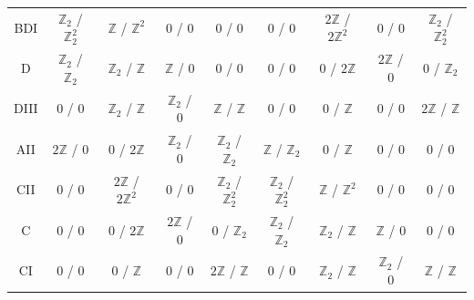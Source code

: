 \documentclass[prl,twocolumn,preprintnumbers,superscriptaddress,amsmath,amssymb]{revtex4-1}
\begin{document}
\begin{table}[tbp]
\begin{center}
\begin{tabular}{ccccccccc}
BDI & $\mathbb{Z}_2$ / \colorbox{blue!10!white}{$\mathbb{Z}_2^2$} & $\mathbb{Z}$ / \colorbox{blue!10!white}{$\mathbb{Z}^2$} & 0 / 0 & 0 / 0 & 0 / 0 & $2\mathbb{Z}$ /  \colorbox{blue!10!white}{$2\mathbb{Z}^2$} & 0 / 0 & $\mathbb{Z}_2$ /  \colorbox{blue!10!white}{$\mathbb{Z}_2^2$} \\
D & $\mathbb{Z}_2$ / $\mathbb{Z}_2$  & $\mathbb{Z}_2$ / \colorbox{blue!10!white}{$\mathbb{Z}$}  & \colorbox{red!25!white}{$\mathbb{Z}$} / 0 & 0 / 0 & 0 / 0 & 0 / \colorbox{blue!25!white}{$2\mathbb{Z}$} & \colorbox{red!25!white}{$2\mathbb{Z}$} / 0 & 0 / \colorbox{blue!25!white}{$\mathbb{Z}_2$} \\
DIII & 0 / 0 & $\mathbb{Z}_2$ / \colorbox{blue!10!white}{$\mathbb{Z}$} & \colorbox{red!25!white}{$\mathbb{Z}_2$} / 0 & \colorbox{red!10!white}{$\mathbb{Z}$} / $\mathbb{Z}$ & 0 / 0 & 0 / \colorbox{blue!25!white}{$\mathbb{Z}$} & 0 / 0 & $2\mathbb{Z}$ / $\mathbb{Z}$ \\
AII & \colorbox{red!25!white}{$2\mathbb{Z}$} / 0 & 0 / \colorbox{blue!25!white}{$2\mathbb{Z}$} & \colorbox{red!25!white}{$\mathbb{Z}_2$} / 0 & \colorbox{red!25!white}{$\mathbb{Z}_2$} / \colorbox{blue!25!white}{$\mathbb{Z}_2$} & \colorbox{red!25!white}{$\mathbb{Z}$} / \colorbox{blue!25!white}{$\mathbb{Z}_2$} & 0 / \colorbox{blue!25!white}{$\mathbb{Z}$} & 0 / 0 & 0 / 0 \\
CII & 0 / 0 & $2\mathbb{Z}$ / \colorbox{blue!10!white}{$2\mathbb{Z}^2$} & 0 / 0 & $\mathbb{Z}_2$ / \colorbox{blue!10!white}{$\mathbb{Z}_2^2$} & $\mathbb{Z}_2$ / \colorbox{blue!10!white}{$\mathbb{Z}_2^2$} & $\mathbb{Z}$ / \colorbox{blue!10!white}{$\mathbb{Z}^2$} & 0 / 0 & 0 / 0 \\
C & 0 / 0 & 0 / \colorbox{blue!25!white}{$2\mathbb{Z}$} & \colorbox{red!25!white}{$2\mathbb{Z}$} / 0 & $0$ / \colorbox{blue!25!white}{$\mathbb{Z}_2$} & $\mathbb{Z}_2$ / $\mathbb{Z}_2$ & $\mathbb{Z}_2$ / \colorbox{blue!10!white}{$\mathbb{Z}$} &  \colorbox{red!25!white}{$\mathbb{Z}$} / 0 & 0 / 0 \\
CI & 0 / 0 & 0 / \colorbox{blue!25!white}{$\mathbb{Z}$} & 0 / 0 & $2\mathbb{Z}$ / $\mathbb{Z}$ & 0 / 0 & $\mathbb{Z}_2$ / \colorbox{blue!10!white}{$\mathbb{Z}$}  & \colorbox{red!25!white}{$\mathbb{Z}_2$} / 0 & \colorbox{red!10!white}{$\mathbb{Z}$} / $\mathbb{Z}$ \\
\hline\hline
\end{tabular}
\end{center}
\label{tableS2}
\end{table}
\end{document}
